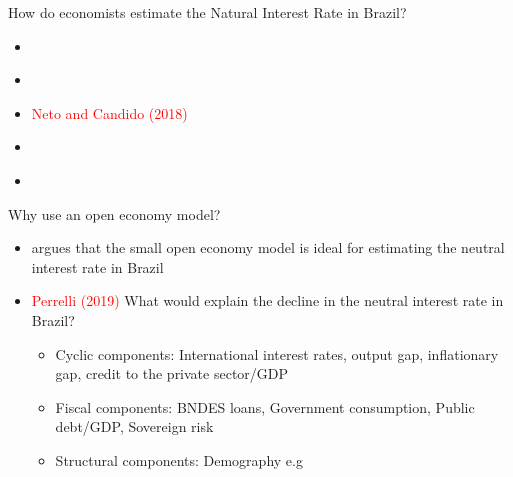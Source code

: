 \documentclass[9pt]{beamer}
\let\olditem\item
\renewcommand{\item}{%
\olditem\vspace{\fill}}
\begin{document}
\begin{frame}{How do economists estimate the Natural Interest Rate in Brazil?}
\begin{itemize}

\item \textcolor{red}{\citet{Portugal:2009}}


\item \textcolor{red}{\citet{Barbosa:2016}}

\item \textcolor{red}{Neto and Candido (2018)}

\item \textcolor{red}{\citet{Moreira:2019}}

\item \textcolor{red}{\citet{Palma:2017}}



\end{itemize}
\end{frame}
\begin{frame}{Why use an open economy model?}
\begin{itemize}

\item \textcolor{red}{\citet{Barbosa:2016}} argues that the small open economy model is ideal for estimating the neutral interest rate in Brazil

\item \textcolor{red}{Perrelli (2019)} What would explain the decline in the neutral interest rate in Brazil?

\begin{itemize}
    \item Cyclic components: International interest rates, output gap, inflationary gap, credit to the private sector/GDP
    
    \item Fiscal components: BNDES loans, Government consumption, Public debt/GDP, Sovereign risk
    
    \item Structural components: Demography e.g \textcolor{red}{\citet{Ferrero:2016}}
\end{itemize}

\end{itemize}
\end{frame}
\end{document}
